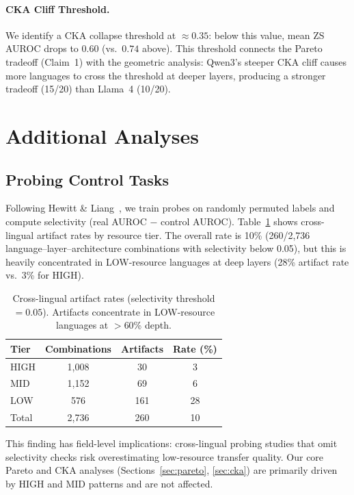 \documentclass[11pt,a4paper]{article}
\begin{document}
\paragraph{CKA Cliff Threshold.}
We identify a CKA collapse threshold at ${\approx}0.35$: below this value, mean ZS AUROC drops to $0.60$ (vs.\ $0.74$ above).
This threshold connects the Pareto tradeoff (Claim~1) with the geometric analysis: Qwen3's steeper CKA cliff causes more languages to cross the threshold at deeper layers, producing a stronger tradeoff (15/20) than Llama~4 (10/20).


\section{Additional Analyses}

\subsection{Probing Control Tasks}
\label{sec:control}

Following Hewitt \& Liang~\cite{hewitt2019designing}, we train probes on randomly permuted labels and compute selectivity (real AUROC $-$ control AUROC).
Table~\ref{tab:control} shows cross-lingual artifact rates by resource tier.
The overall rate is 10\% (260/2,736 language--layer--architecture combinations with selectivity below 0.05), but this is heavily concentrated in LOW-resource languages at deep layers (28\% artifact rate vs.\ 3\% for HIGH).

\begin{table}[t]
\centering
\small
\begin{tabular}{@{}lccc@{}}
\toprule
\textbf{Tier} & \textbf{Combinations} & \textbf{Artifacts} & \textbf{Rate (\%)} \\
\midrule
HIGH & 1,008 & 30 & 3 \\
MID & 1,152 & 69 & 6 \\
LOW & 576 & 161 & 28 \\
\midrule
Total & 2,736 & 260 & 10 \\
\bottomrule
\end{tabular}
\caption{Cross-lingual artifact rates (selectivity threshold $= 0.05$). Artifacts concentrate in LOW-resource languages at $>$60\% depth.}
\label{tab:control}
\end{table}

This finding has field-level implications: cross-lingual probing studies that omit selectivity checks risk overestimating low-resource transfer quality.
Our core Pareto and CKA analyses (Sections~\ref{sec:pareto}, \ref{sec:cka}) are primarily driven by HIGH and MID patterns and are not affected.
\end{document}
